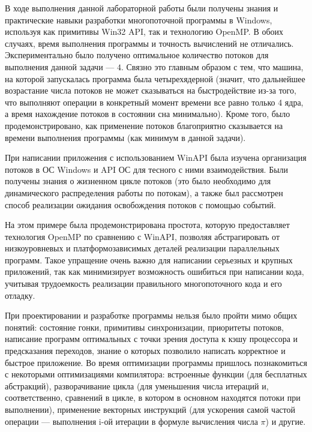\documentclass[a4paper,14pt]{extarticle}
\begin{document}
В ходе выполнения данной лабораторной работы были получены знания и
практические навыки разработки многопоточной программы в Windows, используя как
примитивы Win32 API, так и технологию OpenMP. В обоих случаях, время выполнения
программы и точность вычислений не отличались. Экспериментально было получено
оптимальное количество потоков для выполнения данной задачи --- $4$. Связно это
главным образом с тем, что машина, на которой запускалась программа была
четырехядерной (значит, что дальнейшее возрастание числа потоков не может
сказываться на быстродействие из-за того, что выполняют операции в конкретный
момент времени все равно только 4 ядра, а время нахождение потоков в состоянии сна
минимально). Кроме того, было продемонстрировано, как применение потоков
благоприятно сказывается на времени выполнения программы (как минимум в данной
задачи).

При написании приложения с использованием WinAPI была изучена организация
потоков в ОС Windows и API ОС для тесного с ними взаимодействия. Были получены
знания о жизненном цикле потоков (это было необходимо для динамического
распределения работы по потокам), а также был рассмотрен способ реализации
ожидания освобождения потоков с помощью событий.

На этом примере была продемонстрирована простота, которую предоставляет
технология OpenMP по сравнению с WinAPI, позволяя абстрагировать от
низкоуровневых и платформозависимых деталей реализации параллельных программ.
Такое упращение очень важно для написании серьезных и крупных приложений, так
как минимизирует возможность ошибиться при написании кода, учитывая
трудоемкость реализации правильного многопоточного кода и его отладку.

При проектировании и разработке программы нельзя было пройти мимо общих
понятий: состояние гонки, примитивы синхронизации, приоритеты потоков,
написание программ оптимальных с точки зрения доступа к кэшу процессора и
предсказания переходов, знание о которых позволило написать корректное и быстрое
приложение. Во время оптимизации программы пришлось познакомиться с некоторыми
оптимизациями компилятора: встроенные функции (для бесплатных абстракций),
разворачивание цикла (для уменьшения числа итераций и, соответственно,
сравнений в цикле, в котором в основном находятся потоки при выполнении), применение
векторных инструкций (для ускорения самой частой операции --- выполнения i-ой
итерации в формуле вычисления числа $\pi$) и другие.
\end{document}
